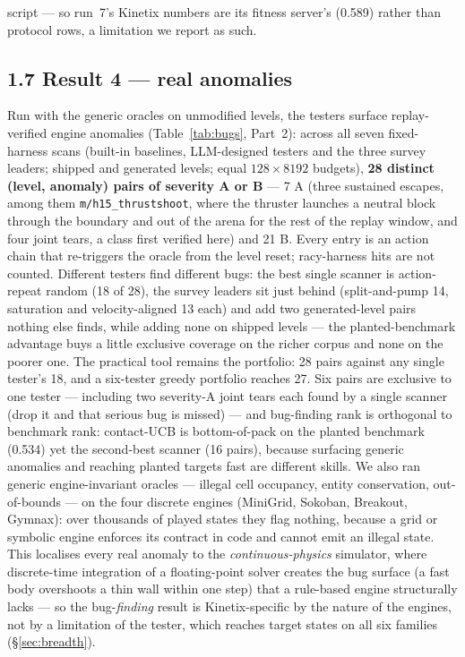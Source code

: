 script --- so run~7's Kinetix numbers are its fitness server's (0.589) rather than protocol rows, a limitation we report as such.

\subsection*{1.7 Result 4 --- real anomalies}
Run with the generic oracles on unmodified levels, the testers surface replay-verified engine anomalies (Table~\ref{tab:bugs}, Part~2): across all seven fixed-harness scans (built-in baselines, LLM-designed testers and the three survey leaders; shipped and generated levels; equal $128\times8192$ budgets), \textbf{28 distinct (level, anomaly) pairs of severity A or B} --- 7 A (three sustained escapes, among them \texttt{m/h15\_thrustshoot}, where the thruster launches a neutral block through the boundary and out of the arena for the rest of the replay window, and four joint tears, a class first verified here) and 21 B. Every entry is an action chain that re-triggers the oracle from the level reset; racy-harness hits are not counted. Different testers find different bugs: the best single scanner is action-repeat random (18 of 28), the survey leaders sit just behind (split-and-pump 14, saturation and velocity-aligned 13 each) and add two generated-level pairs nothing else finds, while adding none on shipped levels --- the planted-benchmark advantage buys a little exclusive coverage on the richer corpus and none on the poorer one. The practical tool remains the portfolio: 28 pairs against any single tester's 18, and a six-tester greedy portfolio reaches 27. Six pairs are exclusive to one tester --- including two severity-A joint tears each found by a single scanner (drop it and that serious bug is missed) --- and bug-finding rank is orthogonal to benchmark rank: contact-UCB is bottom-of-pack on the planted benchmark (0.534) yet the second-best scanner (16 pairs), because surfacing generic anomalies and reaching planted targets fast are different skills. We also ran generic engine-invariant oracles --- illegal cell occupancy, entity conservation, out-of-bounds --- on the four discrete engines (MiniGrid, Sokoban, Breakout, Gymnax): over thousands of played states they flag nothing, because a grid or symbolic engine enforces its contract in code and cannot emit an illegal state. This localises every real anomaly to the \emph{continuous-physics} simulator, where discrete-time integration of a floating-point solver creates the bug surface (a fast body overshoots a thin wall within one step) that a rule-based engine structurally lacks --- so the bug-\emph{finding} result is Kinetix-specific by the nature of the engines, not by a limitation of the tester, which reaches target states on all six families (\S\ref{sec:breadth}).

